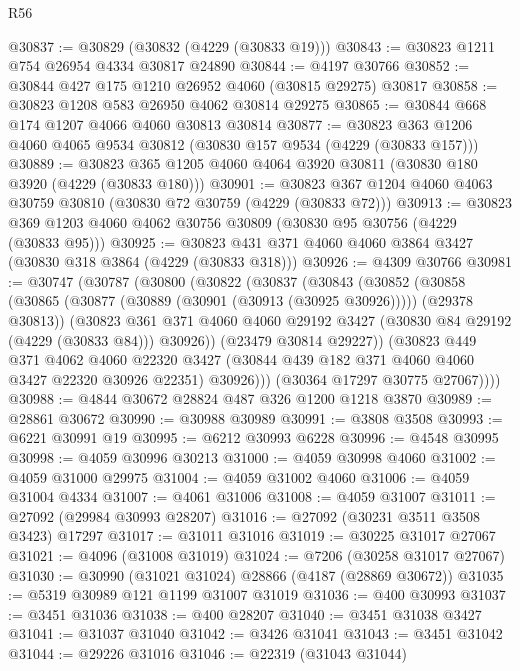 \begin{lexlean}{R56}
\begin{coremodule}
@30837 := @30829 (@30832 (@4229 (@30833 @19)))
@30843 := @30823 @1211 @754 @26954 @4334 @30817 @24890
@30844 := @4197 @30766
@30852 := @30844 @427 @175 @1210 @26952 @4060 (@30815 @29275) @30817
@30858 := @30823 @1208 @583 @26950 @4062 @30814 @29275
@30865 := @30844 @668 @174 @1207 @4066 @4060 @30813 @30814
@30877 := @30823 @363 @1206 @4060 @4065 @9534 @30812 (@30830 @157 @9534 (@4229 (@30833 @157)))
@30889 := @30823 @365 @1205 @4060 @4064 @3920 @30811 (@30830 @180 @3920 (@4229 (@30833 @180)))
@30901 := @30823 @367 @1204 @4060 @4063 @30759 @30810 (@30830 @72 @30759 (@4229 (@30833 @72)))
@30913 := @30823 @369 @1203 @4060 @4062 @30756 @30809 (@30830 @95 @30756 (@4229 (@30833 @95)))
@30925 := @30823 @431 @371 @4060 @4060 @3864 @3427 (@30830 @318 @3864 (@4229 (@30833 @318)))
@30926 := @4309 @30766
@30981 := @30747
    (@30787
      (@30800
        (@30822
          (@30837
            (@30843
              (@30852
                (@30858
                  (@30865 (@30877 (@30889 (@30901 (@30913 (@30925 @30926))))) (@29378 @30813))
                  (@30823
                    @361
                    @371
                    @4060
                    @4060
                    @29192
                    @3427
                    (@30830 @84 @29192 (@4229 (@30833 @84)))
                    @30926))
                (@23479 @30814 @29227))
              (@30823
                @449
                @371
                @4062
                @4060
                @22320
                @3427
                (@30844 @439 @182 @371 @4060 @4060 @3427 @22320 @30926 @22351)
                @30926)))
          (@30364 @17297 @30775 @27067))))
@30988 := @4844 @30672 @28824 @487 @326 @1200 @1218 @3870
@30989 := @28861 @30672
@30990 := @30988 @30989
@30991 := @3808 @3508
@30993 := @6221 @30991 @19
@30995 := @6212 @30993 @6228
@30996 := @4548 @30995
@30998 := @4059 @30996 @30213
@31000 := @4059 @30998 @4060
@31002 := @4059 @31000 @29975
@31004 := @4059 @31002 @4060
@31006 := @4059 @31004 @4334
@31007 := @4061 @31006
@31008 := @4059 @31007
@31011 := @27092 (@29984 @30993 @28207)
@31016 := @27092 (@30231 @3511 @3508 @3423) @17297
@31017 := @31011 @31016
@31019 := @30225 @31017 @27067
@31021 := @4096 (@31008 @31019)
@31024 := @7206 (@30258 @31017 @27067)
@31030 := @30990 (@31021 @31024) @28866 (@4187 (@28869 @30672))
@31035 := @5319 @30989 @121 @1199 @31007 @31019
@31036 := @400 @30993
@31037 := @3451 @31036
@31038 := @400 @28207
@31040 := @3451 @31038 @3427
@31041 := @31037 @31040
@31042 := @3426 @31041
@31043 := @3451 @31042
@31044 := @29226 @31016
@31046 := @22319 (@31043 @31044)

\end{coremodule}
\end{lexlean}
